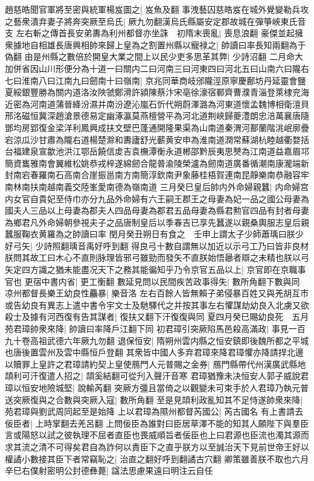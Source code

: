 趙慈皓聞官軍將至密與統軍楊岌圖之|{
	岌魚及翻}
事洩藝囚慈皓岌在城外覺變勒兵攻之藝衆潰弃妻子將奔突厥至烏氏|{
	厥九勿翻漢烏氏縣屬安定郡故城在彈箏峽東氏音支}
左右斬之傳首長安弟夀為利州都督亦坐誅　初隋末喪亂|{
	喪息浪翻}
豪傑並起擁衆據地自相雄長唐興相帥來歸上皇為之割置州縣以寵禄之|{
	帥讀曰率長知兩翻為于偽翻}
由是州縣之數倍於開皇大業之間上以民少吏多思革其弊|{
	少詩沼翻}
二月命大加併省因山川形便分為十道一曰關内二曰河南三曰河東四曰河北五曰山南六曰隴右七曰淮南八曰江南九曰劒南十曰嶺南|{
	京兆同華商岐邠隴涇原寧慶鄜坊丹延靈會鹽夏綏銀豐勝為關内道洛汝陜虢鄭滑許潁陳蔡汴宋亳徐濠宿鄆齊曹濮青淄登萊棣兖海近密為河南道蒲晉絳汾濕并南汾遼沁嵐石忻代朔蔚澤潞為河東道懷孟魏博相衛澶貝邢洺磁恒冀深趙滄景德易定幽涿瀛莫燕檀營平為河北道荆峽歸夔澧朗忠涪萬襄唐隨鄧均房郢復金梁洋利鳳興成扶文壁巴蓬通開隆果渠為山南道秦渭河鄯蘭階洮岷廓疊宕涼瓜沙甘肅為隴右道楊楚滁和夀廬舒光蘄黄安申為淮南道潤常蘇湖杭睦越衢婺括台福建泉宣歙池洪江鄂岳饒信䖍吉袁橅潭衡永道郴邵黔辰夷思僰為江南道益嘉眉邛簡資巂雅南會翼維松姚恭戎梓遂綿劒合龍普渝陵榮瀘為劒南道廣番循潮南康瀧端新封南宕春羅南石高南合崖振邕南方南簡淳欽南尹象藤桂梧賀連南昆靜樂南恭融容牢南林南扶南越南義交陸峯愛南德為嶺南道}
三月癸巳皇后帥内外命婦親蠶|{
	内命婦宫内女官自貴妃至侍巾亦分九品外命婦有六王嗣王郡王之母妻為妃一品之國公母妻為國夫人三品以上母妻為郡夫人四品母妻為郡君五品母妻為縣君勲官四品有封者母妻為鄉君凡外命婦朝參視夫子之品唐制皇后以季春吉已享先蠶遂以親桑輿服志皇后親蠶服鞠衣黄羅為之帥讀曰率}
閏月癸丑朔日有食之　壬申上謂太子少師蕭瑀曰朕少好弓矢|{
	少詩照翻瑀音禹好呼到翻}
得良弓十數自謂無以加近以示弓工乃曰皆非良材朕問其故工曰木心不直則脉理皆邪弓雖勁而發矢不直朕始悟曏者辯之未精也朕以弓矢定四方識之猶未能盡况天下之務其能徧知乎乃令京官五品以上|{
	京官即在京職事官也}
更宿中書内省|{
	更工衡翻}
數延見問以民間疾苦政事得失|{
	數所角翻下數與同}
凉州都督長樂王幼良性麤暴|{
	樂音洛}
左右百餘人皆無賴子弟侵暴百姓又與羌胡互市或告幼良有異志上遣中書令宇文士及馳驛代之并按其事左右懼謀劫幼良入北虜又欲殺士及據有河西復有告其謀者|{
	復扶又翻下汗復復與同}
夏四月癸巳賜幼良死　五月苑君璋帥衆來降|{
	帥讀曰率降戶江翻下同}
初君璋引突厥陷馬邑殺高滿政|{
	事見一百九十卷高祖武德六年厥九勿翻}
退保恒安|{
	隋朔州雲内縣之恒安鎮即後魏所都之平城也唐後置雲州及雲中縣恒戶登翻}
其衆皆中國人多弃君璋來降君璋懼亦降請捍北邊以贖罪上皇許之君璋請約契上皇使鴈門人元普賜之金券|{
	鴈門縣帶代州漢廣武縣地}
頡利可汗復遣人招之|{
	頡奚結翻可從刋入聲汗音寒}
君璋猶豫未决恒安人郭子威說君璋以恒安地險城堅|{
	說輸芮翻}
突厥方彊且當倚之以觀變未可束手於人君璋乃執元普送突厥復與之合數與突厥入寇|{
	數所角翻}
至是見頡利政亂知其不足恃遂帥衆來降|{
	苑君璋與劉武周同起至是始降}
上以君璋為隰州都督芮國公|{
	芮古國名}
有上書請去佞臣者|{
	上時掌翻去羌呂翻}
上問佞臣為誰對曰臣居草澤不能的知其人願陛下與羣臣言或陽怒以試之彼執理不屈者直臣也畏威順旨者佞臣也上曰君源也臣流也濁其源而求其流之清不可得矣君自為詐何以責臣下之直乎朕方以至誠治天下見前世帝王好以權譎小數接其臣下者常竊恥之|{
	治直之翻好呼到翻譎古穴翻}
卿策雖善朕不取也六月辛巳右僕射密明公封德彝薨|{
	諡法思慮果遠曰明注云自任}


